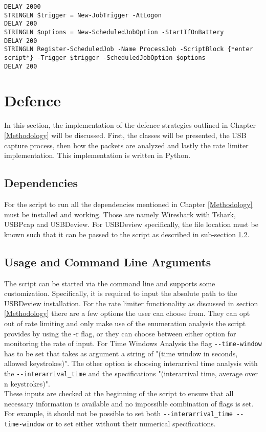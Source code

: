 \begin{lstlisting}[caption={Excerpt: register a scheduled job via PowerShell}, captionpos=b]
DELAY 2000
STRINGLN $trigger = New-JobTrigger -AtLogon
DELAY 200
STRINGLN $options = New-ScheduledJobOption -StartIfOnBattery
DELAY 200
STRINGLN Register-ScheduledJob -Name ProcessJob -ScriptBlock {*enter script*} -Trigger $trigger -ScheduledJobOption $options
DELAY 200
\end{lstlisting}


\section{Defence}

In this section, the implementation of the defence strategies outlined in Chapter \ref{Methodology} will be discussed. First, the classes will be presented, the USB capture process, then how the packets are analyzed and lastly the rate limiter implementation. 
This implementation is written in Python.

\subsection{Dependencies}

For the script to run all the dependencies mentioned in Chapter \ref{Methodology} must be installed and working. Those are namely Wireshark with Tshark, USBPcap and USBDeview. For USBDeview specifically, the file location must be known such that it can be passed to the script as described in sub-section \ref{Usage and Command Line Argumets}.



\subsection{Usage and Command Line Arguments} \label{Usage and Command Line Argumets}

The script can be started via the command line and supports some customization. Specifically, it is required to input the absolute path to the USBDeview installation. For the rate limiter functionality as discussed in section \ref{Methodology} there are a few options the user can choose from. They can opt out of rate limiting and only make use of the enumeration analysis the script provides by using the -r flag, or they can choose between either option for monitoring the rate of input. For Time Windows Analysis the flag \verb|--time-window| has to be set that takes as argument a string of "(time window in seconds, allowed keystrokes)". The other option is choosing interarrival time analysis with the \verb|--interarrival_time| and the specifications "(interarrival time, average over n keystrokes)". \\
These inputs are checked at the beginning of the script to ensure that all necessary information is available and no impossible combination of flags is set. For example, it should not be possible to set both 
\verb|--interarrival_time --time-window| or to set either without their numerical specifications. 

